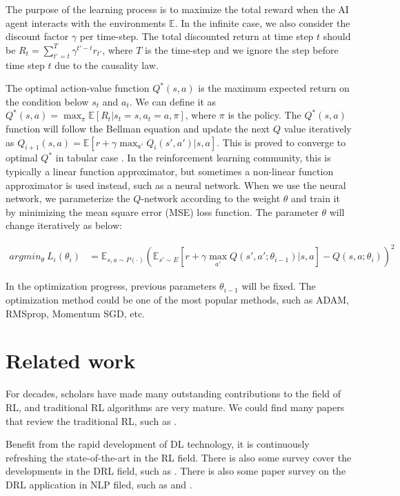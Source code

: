 \documentclass{article}
\begin{document}
The purpose of the learning process is to maximize the total reward when the AI agent interacts with the environments $\mathbb{E}$. In the infinite case, we also consider the discount factor $\gamma$ per time-step. The total discounted return  at time step $t$ should be  $R_t = \sum_{t'=t}^{T} \gamma^{t'-t} r_{t'}$, where $T$ is the time-step and we ignore the step before time step $t$ due to the causality law.

The optimal action-value function $Q^*(s,a)$  is  the maximum expected return on the condition below $s_t$ and $a_t$. We can define  it as $Q^*(s,a) = \max_{\pi} \mathbb{E}[{ R_t | s_t=s, a_t=a, \pi }]$, where $\pi$ is the policy. The $Q^*(s,a)$ function will follow the  Bellman equation and update the next $Q$ value iteratively as $Q_{i+1}(s,a) = \mathbb{E}\left[ r + \gamma \max_{a'} Q_i(s', a') | s, a \right]$. This is proved to converge to optimal $Q^ * $ in tabular case \citep{sutton2018reinforcement}. 
In the reinforcement learning community, this is typically a linear function approximator, but sometimes a non-linear function approximator is used instead, such as a neural network. When we use the neural network, we parameterize the $Q$-network according to the weight $\theta$ and train it by minimizing the mean square error (MSE) loss function. The parameter $\theta$ will change iteratively as below:

\begin{align}
	argmin _\theta  \ L_i\left(\theta_i\right) &= \mathbb{E}_{s,a \sim P(\cdot)}{\left( \mathbb{E}_{s' \sim {E}}[{r + \gamma \max_{a'} Q(s', a'; \theta_{i-1}) | s, a }] - Q \left(s,a ; \theta_i \right) \right)^2}
\end{align}


In the optimization progress, previous parameters  $\theta_{i-1}$ will be fixed.  The optimization method could be one of the most popular methods, such as ADAM, RMSprop, Momentum SGD, etc.
%

\section{Related work}
\label{sec:Related work}
For decades, scholars have made many outstanding contributions to the field of RL, and traditional RL algorithms are very mature.  We could find many papers that review the traditional RL, such as \citep{gosavi2009reinforcement, kaelbling1996reinforcement, sutton2018reinforcement, szepesvari2010algorithms}.

Benefit from the rapid development of DL technology, it is continuously refreshing the state-of-the-art in the RL field. There is also some survey cover the developments in the DRL field, such as \citep{arulkumaran2017brief}. There is also some paper survey on the DRL application in NLP filed, such as \citep{ranzato2015sequence} and \citep{bahdanau2016actor}.
\end{document}
